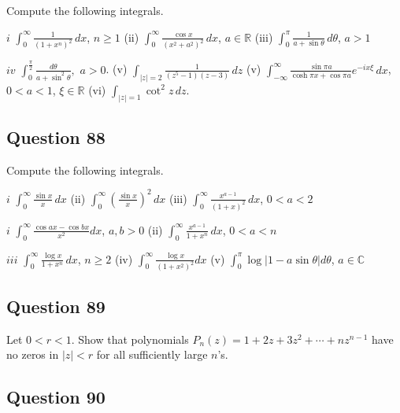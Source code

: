\documentclass[12pt]{article}
\begin{document}
Compute the following integrals.

\(i\) \(\displaystyle \int_0^\infty \frac{1}{(1 + x^n)^2} \, dx\),
\(n \geq 1\) (ii)
\(\displaystyle \int_0^\infty \frac{\cos x}{(x^2 + a^2)^2} \, dx\),
\(a \in \mathbb R\) (iii)
\(\displaystyle \int_0^\pi \frac{1}{a + \sin \theta} \, d \theta\),
\(a>1\)

\(iv\)
\(\displaystyle \int_0^{\frac{\pi}{2}} \frac{d \theta}{a+ \sin ^2 \theta},\)
\(a >0\). (v)
\(\displaystyle \int_{|z|=2} \frac{1}{(z^{5} -1) (z-3)} \, dz\) (v)
\(\displaystyle \int_{- \infty}^{\infty} \frac{\sin \pi a}{\cosh \pi x + \cos \pi a} e^{- i x \xi} \, d x\),
\(0< a <1\), \(\xi \in \mathbb R\) (vi)
\(\displaystyle \int_{|z| = 1} \cot^2 z \, dz\).

\hypertarget{question-88-1}{%
\subsection{Question 88}\label{question-88-1}}

Compute the following integrals.

\(i\) \(\displaystyle \int_0^\infty \frac{\sin x}{x} \, dx\) (ii)
\(\displaystyle \int_0^\infty (\frac{\sin x}{x})^2 \, dx\) (iii)
\(\displaystyle \int_0^\infty \frac{x^{a-1}}{(1 + x)^2} \, dx\),
\(0< a < 2\)

\(i\) \(\displaystyle \int_0^\infty \frac{\cos a x - \cos bx}{x^2} dx\),
\(a, b >0\) (ii)
\(\displaystyle \int_0^\infty \frac{x^{a-1}}{1 + x^n} \, dx\),
\(0< a < n\)

\(iii\) \(\displaystyle \int_0^\infty \frac{\log x}{1 + x^n} \, dx\),
\(n \geq 2\) (iv)
\(\displaystyle \int_0^\infty \frac{\log x}{(1 + x^2)^2} dx\) (v)
\(\displaystyle \int_0^{\pi} \log|1 - a \sin \theta| d \theta\),
\(a \in \mathbb C\)

\hypertarget{question-89-1}{%
\subsection{Question 89}\label{question-89-1}}

Let \(0<r<1\). Show that polynomials
\(P_n(z) = 1 + 2z + 3 z^2 + \cdots + n z^{n-1}\) have no zeros in
\(|z|<r\) for all sufficiently large \(n\)'s.

\hypertarget{question-90-1}{%
\subsection{Question 90}\label{question-90-1}}
\end{document}

